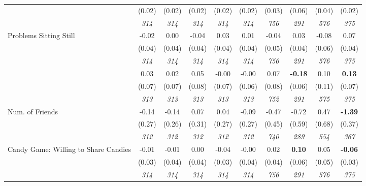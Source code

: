 \begin{tabular}{l c c c c c c c c c}
& (0.02) & (0.02) & (0.02) & (0.02) & (0.02) & (0.03) & (0.06) & (0.04) & (0.02) \\
& \textit{ 314 } & \textit{ 314 } & \textit{ 314 } & \textit{ 314 } & \textit{ 314 } & \textit{ 756 } & \textit{ 291 } & \textit{ 576 } & \textit{ 375 } \\
Problems Sitting Still & -0.02 & 0.00 & -0.04 & 0.03 & 0.01 & -0.04 & 0.03 & -0.08 & 0.07 \\
& (0.04) & (0.04) & (0.04) & (0.04) & (0.04) & (0.05) & (0.04) & (0.06) & (0.04) \\
& \textit{ 314 } & \textit{ 314 } & \textit{ 314 } & \textit{ 314 } & \textit{ 314 } & \textit{ 756 } & \textit{ 291 } & \textit{ 576 } & \textit{ 375 } \\
& 0.03 & 0.02 & 0.05 & -0.00 & -0.00 & 0.07 & \textbf{-0.18} & 0.10 & \textbf{0.13} \\
& (0.07) & (0.07) & (0.08) & (0.07) & (0.06) & (0.08) & (0.06) & (0.11) & (0.07) \\
& \textit{ 313 } & \textit{ 313 } & \textit{ 313 } & \textit{ 313 } & \textit{ 313 } & \textit{ 752 } & \textit{ 291 } & \textit{ 575 } & \textit{ 375 } \\
Num. of Friends & -0.14 & -0.14 & 0.07 & 0.04 & -0.09 & -0.47 & -0.72 & 0.47 & \textbf{-1.39} \\
& (0.27) & (0.26) & (0.31) & (0.27) & (0.27) & (0.45) & (0.59) & (0.68) & (0.37) \\
& \textit{ 312 } & \textit{ 312 } & \textit{ 312 } & \textit{ 312 } & \textit{ 312 } & \textit{ 740 } & \textit{ 289 } & \textit{ 554 } & \textit{ 367 } \\
Candy Game: Willing to Share Candies & -0.01 & -0.01 & 0.00 & -0.04 & -0.00 & 0.02 & \textbf{0.10} & 0.05 & \textbf{-0.06} \\
& (0.03) & (0.04) & (0.04) & (0.03) & (0.04) & (0.04) & (0.06) & (0.05) & (0.03) \\
& \textit{ 314 } & \textit{ 314 } & \textit{ 314 } & \textit{ 314 } & \textit{ 314 } & \textit{ 756 } & \textit{ 291 } & \textit{ 576 } & \textit{ 375 } \\
\bottomrule
\end{tabular}
